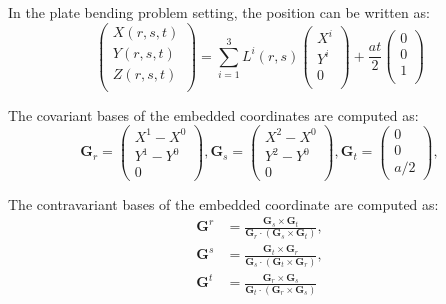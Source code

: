 \documentclass{article}
\begin{document}
In the plate bending problem setting, the position can be written as:
\begin{equation}
\left(\begin{array}{l} X(r,s,t)\\ Y(r,s,t)\\ Z(r,s,t)\\ \end{array}\right)
 = \sum_{i=1}^3L^i(r,s)
\left(\begin{array}{l} X^i\\ Y^i\\ 0\\ \end{array}\right)
 + \frac{at}{2}
\left(\begin{array}{l} 0\\ 0\\ 1\\ \end{array}\right)
\label{eqn:undef}
\end{equation}

The covariant bases of the embedded coordinates are computed as:
%
\begin{equation}
\textbf{G}_r = \left(\begin{array}{c}
X^1-X^0\\
Y^1-Y^0\\
0\end{array}\right),
\textbf{G}_s = \left(\begin{array}{c}
X^2-X^0\\
Y^2-Y^0\\
0\end{array}\right),
\textbf{G}_t = \left(\begin{array}{c}
0\\
0\\
a/2\end{array}\right),
\label{eqn:covbasis}
\end{equation}

The contravariant bases of the embedded coordinate are computed as:
%
\begin{align}
\textbf{G}^r &= \frac{\mathbf{G}_s\times\mathbf{G}_t}{\mathbf{G}_r\cdot(\mathbf{G}_s\times\mathbf{G}_t)},\\
\textbf{G}^s &= \frac{\mathbf{G}_t\times\mathbf{G}_r}{\mathbf{G}_s\cdot(\mathbf{G}_t\times\mathbf{G}_r)},\\
\textbf{G}^t &= \frac{\mathbf{G}_r\times\mathbf{G}_s}{\mathbf{G}_t\cdot(\mathbf{G}_r\times\mathbf{G}_s)}
\end{align}
\end{document}
